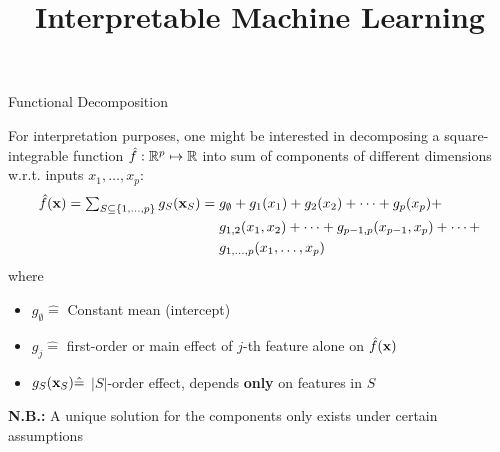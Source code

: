 \documentclass[11pt,compress,t,notes=noshow, aspectratio=169, xcolor=table]{beamer}
\title{Interpretable Machine Learning}
\date{}
\newcommand{\open}{}
\newcommand{\close}{}
\begin{document}
\newcommand{\titlefigure}{figure/open_blackbox}
\newcommand{\learninggoals}{
\item What are additive decomposition of prediction functions?
\item Why are they useful?
\item How do we obtain them?}


\begin{frame}{Functional Decomposition
}

For interpretation purposes, one might be interested in decomposing a square-integrable function $\hat{f}: \mathbb{R}^p \mapsto \mathbb{R}$ into sum of components of different dimensions w.r.t. inputs $x_1, \ldots, x_p$: %
\begin{equation*}
\begin{split}
\fh(\xv) =  %
\textstyle\sum_{S \subseteq \{1,\ldots,p\}} g_{S}(\xv_S) = \; & g_{\open \emptyset \close} + g_{\open 1 \close}(x_1) + g_{\open 2 \close}(x_2) + \dots + g_{\open p \close}(x_p) + \\
& g_{\open 1, 2 \close}(x_1, x_2) + \dots + g_{\open p-1, p \close}(x_{p-1}, x_p) + \dots + \\
& g_{\open 1,\ldots,p \close}(x_1, \ldots, x_p)
\end{split}
\end{equation*}
where 
\begin{itemize}
\item $g_{\open \emptyset \close} \hat = $ Constant mean (intercept) %
\item $g_{\open j \close} \hat = $ first-order or main effect of $j$-th feature alone on $\hat{f}(\mathbf{x})$
\item $g_{S}(\mathbf{x}_S) \hat = $ $|S|$-order effect, depends \textbf{only} on features in $S$ %
\end{itemize}
\lz
\textbf{N.B.:} %
A unique solution for the components only exists under certain assumptions


\end{frame}
\end{document}
